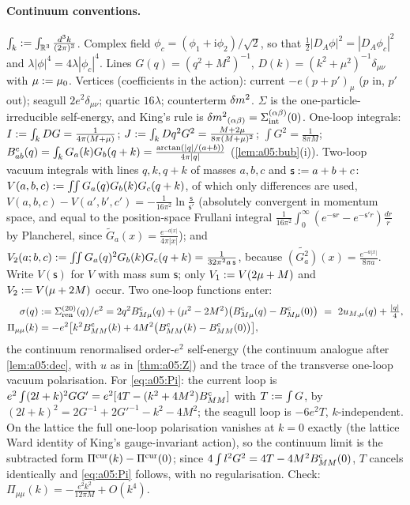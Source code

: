\paragraph{Continuum conventions.} $\int_k:=\int_{\mathbb R^3}\frac{d^3k}{(2\pi)^3}$. Complex field $\phi_c=(\phi_1+\mathrm i\phi_2)/\sqrt2$, so that $\frac12|D_A\phi|^2=|D_A\phi_c|^2$ and $\lambda|\phi|^4=4\lambda|\phi_c|^4$. Lines $G(q)=(q^2+M^2)^{-1}$, $D(k)=(k^2+\mu^2)^{-1}\delta_{\mu\nu}$ with $\mu:=\mu_0$. Vertices (coefficients in the action): current $-e(p+p')_\mu$ ($p$ in, $p'$ out); seagull $2e^2\delta_{\mu\nu}$; quartic $16\lambda$; counterterm ${\delta m^2}$. $\Sigma$ is the one-particle-irreducible self-energy, and King's rule is ${\delta m^2}_{(\alpha\beta)}=\Sigma^{(\alpha\beta)}_{\rm int}(0)$. One-loop integrals: $I:=\int_kDG=\frac1{4\pi(M+\mu)}$; $J:=\int_kDq^2G^2=\frac{M+2\mu}{8\pi(M+\mu)^2}$; $\int G^2=\frac1{8\pi M}$; $B^{\mathrm c}_{ab}(q)=\int_kG_a(k)G_b(q+k)=\frac{\arctan(|q|/(a+b))}{4\pi|q|}$ (\cref{lem:a05:bub}(i)). Two-loop vacuum integrals with lines $q,k,q+k$ of masses $a,b,c$ and $\mathsf s:= a+b+c$: $V(a,b,c):=\int\!\!\int G_a(q)G_b(k)G_c(q+k)$, of which only differences are used, $V(a,b,c)-V(a',b',c')=-\frac1{16\pi^2}\ln\frac{\mathsf s}{\mathsf s'}$ (absolutely convergent in momentum space, and equal to the position-space Frullani integral $\frac1{16\pi^2}\int_0^\infty(e^{-\mathsf sr}-e^{-\mathsf s'r})\frac{dr}r$ by Plancherel, since $\tilde G_a(x)=\frac{e^{-a|x|}}{4\pi|x|}$); and $V_2(a;b,c):=\int\!\!\int G_a(q)^2G_b(k)G_c(q+k)=\frac1{32\pi^2a\,\mathsf s}$, because $\widetilde{(G_a^2)}(x)=\frac{e^{-a|x|}}{8\pi a}$. Write $V(\mathsf s)$ for $V$ with mass sum $\mathsf s$; only $V_1:= V(2\mu+M)$ and $V_2:= V(\mu+2M)$ occur. Two one-loop functions enter:
\begin{align}
\sigma(q)&\defeq\Sigma^{(20)}_{\rm ren}(q)/e^2=2q^2\Bc_{M\mu}(q)+(\mu^2-2M^2)\big(\Bc_{M\mu}(q)-\Bc_{M\mu}(0)\big)\ =\ 2u_{M,\mu}(q)+\tfrac{|q|}4,\label{eq:a05:sigma}\\
\Pi_{\mu\mu}(k)&=-e^2\big[k^2\Bc_{MM}(k)+4M^2\big(\Bc_{MM}(k)-\Bc_{MM}(0)\big)\big],\label{eq:a05:Pi}
\end{align}
the continuum renormalised order-$e^2$ self-energy (the continuum analogue after \cref{lem:a05:dec}, with $u$ as in \cref{thm:a05:Z}) and the trace of the transverse one-loop vacuum polarisation. For \eqref{eq:a05:Pi}: the current loop is $e^2\int(2l+k)^2GG'=e^2[4T-(k^2+4M^2)B^{\mathrm c}_{MM}]$ with $T:=\int G$, by $(2l+k)^2=2G^{-1}+2G'^{-1}-k^2-4M^2$; the seagull loop is $-6e^2T$, $k$-independent. On the lattice the full one-loop polarisation vanishes at $k=0$ exactly (the lattice Ward identity of King's gauge-invariant action), so the continuum limit is the subtracted form $\Pi^{\rm cur}(k)-\Pi^{\rm cur}(0)$; since $4\int l^2G^2=4T-4M^2B^{\mathrm c}_{MM}(0)$, $T$ cancels identically and \eqref{eq:a05:Pi} follows, with no regularisation. Check: $\Pi_{\mu\mu}(k)=-\frac{e^2k^2}{12\pi M}+O(k^4)$.

